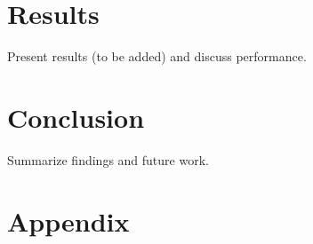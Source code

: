 \section{Results}
Present results (to be added) and discuss performance.

\section{Conclusion}
Summarize findings and future work.

\clearpage
\appendix
\section*{Appendix}








